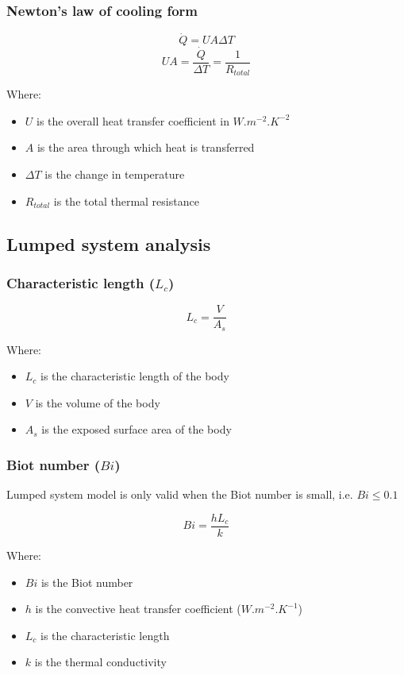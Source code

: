 \documentclass[11pt]{article}
\begin{document}
\subsubsection{Newton's law of cooling form}
\label{sec:orgf4a3b1f}
\[\dot{Q} = UA \Delta T\]
\[UA = \frac{\dot{Q}}{\Delta T} = \frac{1}{R_{total}}\]

Where:
\begin{itemize}
\item \(U\) is the overall heat transfer coefficient in \(\unit{W.m^{-2}.K^{-2}}\)
\item \(A\) is the area through which heat is transferred
\item \(\Delta T\) is the change in temperature
\item \(R_{total}\) is the total thermal resistance
\end{itemize}

 \newpage

\subsection{Lumped system analysis}
\label{sec:org9cf7396}

\subsubsection{Characteristic length (\(L_c\))}
\label{sec:orgf2427ec}
\[L_c = \frac{V}{A_s}\]

Where:
\begin{itemize}
\item \(L_c\) is the characteristic length of the body
\item \(V\) is the volume of the body
\item \(A_s\) is the exposed surface area of the body
\end{itemize}

\subsubsection{Biot number (\(Bi\))}
\label{sec:orgce72750}
Lumped system model is only valid when the Biot number is small, i.e. \(Bi \le 0.1\)

\[Bi = \frac{h L_c}{k}\]

Where:
\begin{itemize}
\item \(Bi\) is the Biot number
\item \(h\) is the convective heat transfer coefficient (\(\unit{W.m^{-2}.K^{-1}}\))
\item \(L_c\) is the characteristic length
\item \(k\) is the thermal conductivity
\end{itemize}
\end{document}
